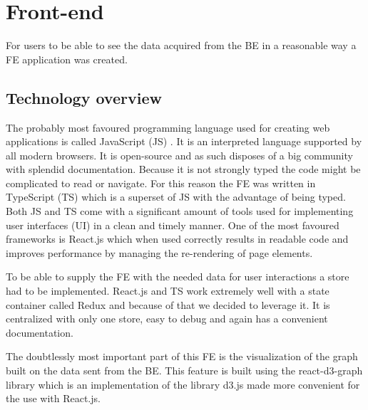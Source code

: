 \section{Front-end}
For users to be able to see the data acquired from the BE in a reasonable way a FE application was created. 
\subsection{Technology overview}
The probably most favoured programming language used for creating web applications \cite{jsGithut} is called JavaScript (JS) \cite{javaScript}. It is an interpreted language supported by all modern browsers. It is open-source and as such disposes of a big community with splendid documentation. Because it is not strongly typed the code might be complicated to read or navigate. For this reason the FE was written in TypeScript (TS) \cite{typeScript} which is a superset of JS with the advantage of being typed. Both JS and TS come with a significant amount of tools used for implementing user interfaces (UI) in a clean and timely manner. One of the most favoured frameworks is React.js \cite{react} which when used correctly results in readable code and improves performance by managing the re-rendering of page elements.

To be able to supply the FE with the needed data for user interactions a store had to be implemented. React.js and TS work extremely well with a state container called Redux \cite{redux} and because of that we decided to leverage it. It is centralized with only one store, easy to debug and again has a convenient documentation. 

The doubtlessly most important part of this FE is the visualization of the graph built on the data sent from the BE. This feature is built using the react-d3-graph library \cite{reactD3Graph} which is 
an implementation of the library d3.js \cite{d3} made more convenient for the use with React.js. 

